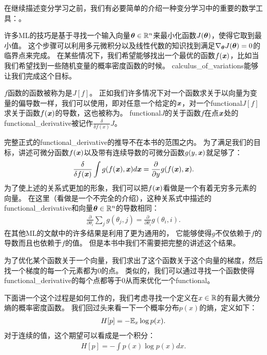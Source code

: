 在继续描述变分学习之前，我们有必要简单的介绍一种变分学习中的重要的数学工具：。


许多\gls{ML}的技巧是基于寻找一个输入向量$\boldsymbol{\theta}\in\mathbb{R}^n$来最小化函数$J(\boldsymbol{\theta})$，使得它取到最小值。
这个步骤可以利用多元微积分以及线性代数的知识找到满足$\nabla_{\boldsymbol{\theta}} J(\boldsymbol{\theta}) = 0$的临界点来完成。
在某些情况下，我们希望能够找出一个最优的函数$f(\boldsymbol{\mathit{x}})$，比如当我们希望找到一些随机变量的概率密度函数的时候。
\gls{calculus_of_variations}能够让我们完成这个目标。



$f$函数的函数被称为是$J[f]$。
正如我们许多情况下对一个函数求关于以向量为变量的偏导数一样，我们可以使用，即对任意一个给定的$\boldsymbol{\mathit{x}}$，对一个\gls{functional}$J[f]$求关于函数$f(\boldsymbol{\mathit{x}})$的导数，这也被称为。
\gls{functional}$J$的关于函数$f$在点$\boldsymbol{\mathit{x}}$处的\gls{functional_derivative}被记作$\frac{\delta}{\delta f(x)}J$。



完整正式的\gls{functional_derivative}的推导不在本书的范围之内。
为了满足我们的目标，讲述可微分函数$f(\boldsymbol{\mathit{x}})$以及带有连续导数的可微分函数$g(y,\boldsymbol{\mathit{x}})$就足够了：
\begin{align}
	\frac{\delta}{\delta f(\boldsymbol{\mathit{x}})} \int g(f(\boldsymbol{\mathit{x}}),\boldsymbol{\mathit{x}})d\boldsymbol{\mathit{x}} = \frac{\partial}{\partial y}g(f(\boldsymbol{\mathit{x}}),\boldsymbol{\mathit{x}}).
\end{align}
为了使上述的关系式更加的形象，我们可以把$f(\boldsymbol{\mathit{x}})$看做是一个有着无穷多元素的向量。
在这里（看做是一个不完全的介绍），这种关系式中描述的\gls{functional_derivative}和向量$\boldsymbol{\theta}\in\mathbb{R}^n$的导数相同：
\begin{align}
	\frac{\partial}{\partial \theta_i}\sum_{j}^{}g(\theta_j,j) = \frac{\partial}{\partial \theta_i}g(\theta_i,i).
\end{align}
在其他\gls{ML}的文献中的许多结果是利用了更为通用的，
它能够使得$g$不仅依赖于$f$的导数而且也依赖于$f$的值。
但是本书中我们不需要把完整的讲述这个结果。


为了优化某个函数关于一个向量，我们求出了这个函数关于这个向量的梯度，然后找一个梯度的每一个元素都为0的点。
类似的，我们可以通过寻找一个函数使得\gls{functional_derivative}的每个点都等于0从而来优化一个\gls{functional}。


下面讲一个这个过程是如何工作的，我们考虑寻找一个定义在$x\in\mathbb{R}$的有最大微分熵的概率密度函数。
我们回过头来看一下一个概率分布$p(x)$的熵，定义如下：
\begin{align}
	H[p] = - \mathbb{E}_x \log p(x).
\end{align}
对于连续的值，这个期望可以看成是一个积分：
\begin{align}
	H[p] = - \int p(x) \log p(x) dx.
\end{align}


